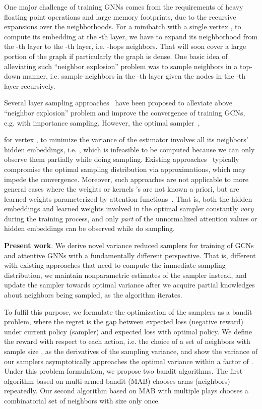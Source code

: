 \documentclass{article}
\begin{document}
One major challenge of training GNNs comes from
the requirements of heavy floating point operations and 
large memory footprints, due to the recursive
expansions over the neighborhoods.
For a minibatch with a single vertex , 
to compute its embedding  at 
the -th layer, we have to expand
its neighborhood from the -th layer to
the -th layer, i.e. -hops neighbors. That will
soon cover a large portion of the
graph if particularly the graph is dense.
One basic idea of alleviating such ``neighbor explosion'' problem
was to sample neighbors in a top-down
manner, i.e. sample neighbors in the 
-th layer given the nodes in the 
-th layer recursively.

Several layer sampling 
approaches~\cite{hamilton2017inductive,chen2018fastgcn,huang2018adaptive,zou2019layer} 
have been proposed to alleviate above 
``neighbor explosion'' problem and improve the 
convergence of training GCNs, e.g. with importance
sampling. 
However, the optimal sampler~\cite{huang2018adaptive}, 
 
for vertex ,
to minimize the variance of the estimator  
involves all its neighbors' hidden 
embeddings, i.e. , 
which is infeasible to be computed because we can only observe
them partially while doing sampling. Existing 
approaches~\cite{chen2018fastgcn,huang2018adaptive,zou2019layer}
typically compromise the optimal sampling distribution via approximations,
which may impede the convergence. Moreover, such approaches are 
not applicable to more general cases
where the weights or kernels 's are not known a priori,
but are learned weights parameterized by 
attention functions~\cite{velivckovic2017graph}. 
That is, both the hidden embeddings and learned weights
involved in the optimal sampler constantly
\emph{vary} during the training process, and only \emph{part} of 
the unnormalized attention values or hidden embeddings
can be observed while do sampling.

{\bfseries Present work}. We derive novel variance reduced 
samplers for training of GCNs and attentive GNNs with a 
fundamentally different perspective. That is, different 
with existing approaches that need to compute the 
immediate sampling distribution, 
we maintain nonparametric estimates
of the sampler instead, and update the 
sampler towards optimal variance after we 
acquire partial knowledges 
about neighbors being sampled, as the algorithm
iterates.

To fulfil this purpose, we formulate the optimization
of the samplers as a bandit problem, where
the regret is the gap between expected
loss (negative reward) under current policy (sampler) and expected
loss with optimal policy. We define the reward 
with respect to each action, i.e. the choice 
of a set of neighbors with sample size ,
as the derivatives of the sampling variance, and show
the variance of our samplers asymptotically approaches
the optimal variance within a factor of .
Under this problem formulation, we propose two bandit algorithms.
The first algorithm based on multi-armed bandit (MAB) chooses 
 arms (neighbors) repeatedly.
Our second algorithm based on MAB with multiple plays
chooses a combinatorial set of neighbors with size  only once.
\end{document}
